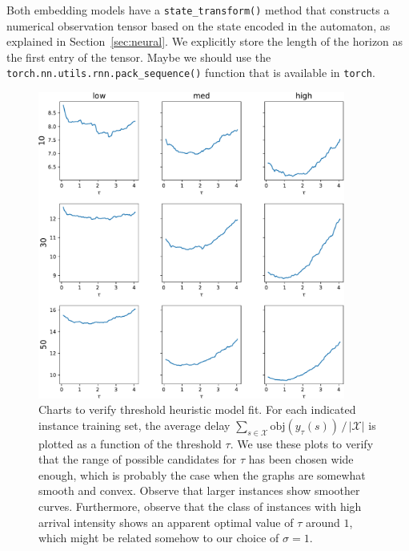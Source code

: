 \documentclass[a4paper]{article}
\theoremstyle{definition}
\theoremstyle{plain}
\begin{document}
Both embedding models have a \texttt{state\_transform()} method that constructs
a numerical observation tensor based on the state encoded in the automaton, as
explained in Section~\ref{sec:neural}. We explicitly store the length of the
horizon as the first entry of the tensor. Maybe we should use the
\texttt{torch.nn.utils.rnn.pack\_sequence()} function that is available in
\texttt{torch}.



\newpage


\begin{figure}
  \centering
  \includegraphics[width=0.9\textwidth]{figures/tau_fit.pdf}
  \caption{Charts to verify threshold heuristic model fit. For each indicated
    instance training set, the average delay
    $\sum_{s \in \mathcal{X}} \textrm{obj}(y_{\tau}(s)) \, / \, {|\mathcal{X}|}$
    is plotted as a function of the threshold $\tau$. We use these plots to
    verify that the range of possible candidates for $\tau$ has been chosen wide
    enough, which is probably the case when the graphs are somewhat smooth and
    convex. Observe that larger instances show smoother curves. Furthermore,
    observe that the class of instances with high arrival intensity shows an
    apparent optimal value of $\tau$ around $1$, which might be related somehow
    to our choice of $\sigma = 1$.}
  \label{fig:tau_fit}
\end{figure}
\end{document}
